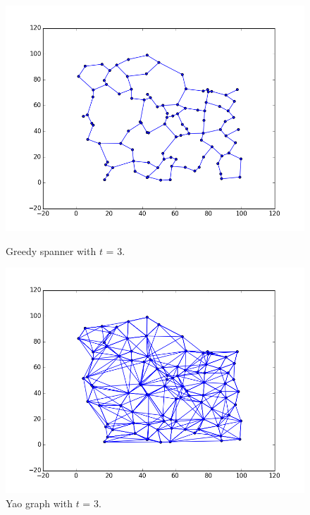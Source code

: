 \documentclass[a4paper,twoside,11pt,hidelinks]{article}
\theoremstyle{plain}
\theoremstyle{definition}  %
\begin{document}
\begin{figure}[h]
    \begin{minipage}[t]{0.48\textwidth}
        \centering
        \includegraphics[width=\textwidth]{figures/greedy_100_points_dilation_3}
        \caption{Greedy spanner with $t$ = 3.}
        \label{fig:greedy_100_dilation}
    \end{minipage}
    \hfill
    \begin{minipage}[t]{0.48\textwidth}
        \centering
        \includegraphics[width=\textwidth]{figures/yao_100_points_dilation_3}
        \caption{Yao graph with $t$ = 3.}
        \label{fig:yao_100_dilation}
    \end{minipage}
\end{figure}
\end{document}
